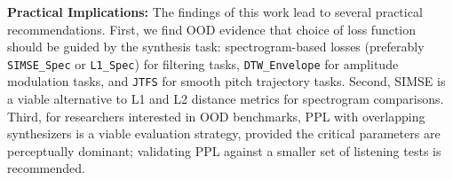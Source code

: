 \documentclass[10pt]{article} %
\newcommand{\SIMSESpec}{\texttt{SIMSE\_\allowbreak Spec}\xspace}
\newcommand{\LoneSpec}{\texttt{L1\_\allowbreak Spec}\xspace}
\newcommand{\JTFS}{\texttt{JTFS}\xspace}
\newcommand{\DTWEnv}{\texttt{DTW\_\allowbreak Envelope}\xspace}
\begin{document}



\textbf{Practical Implications:} The findings of this work lead to several practical recommendations. First, we find OOD evidence that choice of loss function should be guided by the synthesis task: spectrogram-based losses (preferably \SIMSESpec{} or \LoneSpec{}) for filtering tasks, \DTWEnv{} for amplitude modulation tasks, and \JTFS{} for smooth pitch trajectory tasks.  Second, SIMSE is a viable alternative to L1 and L2 distance metrics for spectrogram comparisons. Third, for researchers interested in OOD benchmarks, PPL with overlapping synthesizers is a viable evaluation strategy, provided the critical parameters are perceptually dominant; validating PPL against a smaller set of listening tests is recommended. 

\end{document}
